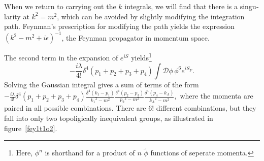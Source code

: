 \begin{english}
When we return to carrying out the $k$ integrals, we will find that there is a singularity at $k^2=m^2$, which can be avoided by slightly modifying the integration path. Feynman's prescription for modifying the path yields the expression $(k^2-m^2+i\epsilon)^{-1}$, the Feynman propagator in momentum space. 

The second term in the expansion of $e^{iS}$ yields\footnote{Here, $\phi^n$ is shorthand for a product of $n$ $\tilde\phi$ functions of seperate momenta.} 
\[-\frac{i\lambda}{4!}\delta^4(p_1+p_2+p_3+p_4)\int\mathcal D\phi\,\phi^6e^{iS_F}.\] 
Solving the Gaussian integral gives a sum of terms of the form 
\(-\frac{i\lambda}{4!}\delta^4(p_1+p_2+p_3+p_4)\frac{\delta^4(k_1-p_1)}{{k_1}^2-m^2}\frac{\delta^4(p_2-p_3)}{{p_2}^2-m^2}\frac{\delta^4(p_4-k_A)}{{k_A}^2-m^2},\label{1t1f}\)
where the momenta are paired in all possible combinations. There are $6!$ different combinations, but they fall into only two topoligically inequivalent groups, as illustrated in figure~\ref{fey1t1o2}.


\end{english}
